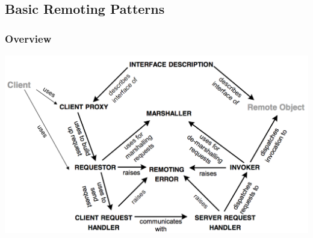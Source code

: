 \documentclass[10pt]{article}
\begin{document}
\subsection{Basic Remoting Patterns}
\subsubsection{Overview}
\begin{center}
	\includegraphics[scale=0.25]{basic-remote-patterns.png}
\end{center}
\end{document}

